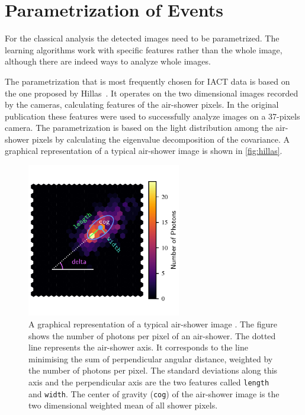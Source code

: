 \section{Parametrization of Events}
\label{sec:params}
%
For the classical analysis the detected images need to be parametrized. The
learning algorithms work with specific features rather than the whole image,
although there are indeed ways to analyze whole images.

The parametrization that is most frequently chosen for IACT data is based on
the one proposed by Hillas~\cite{Hillas}. It operates on the two dimensional
images recorded by the cameras, calculating features of the air-shower pixels.
In the original publication these features were used to successfully analyze
images on a 37-pixels camera. The parametrization is based on the light
distribution among the air-shower pixels by calculating the eigenvalue
decomposition of the covariance. A graphical representation of a typical
air-shower image is shown in \autoref{fig:hillas}.
%
\begin{figure}
  \centering%
  \includegraphics[width=0.6\textwidth]{Plots/hillas.pdf}%
  \caption{A graphical representation of a typical air-shower image \cite{maxhillas}. The figure shows the number of photons per pixel of an air-shower. The dotted
  line represents the air-shower axis. It corresponds to the line minimising the
  sum of perpendicular angular distance, weighted by the number of photons per
  pixel. The standard deviations along this axis and the perpendicular axis are
  the two features called \texttt{length} and \texttt{width}. The center of
  gravity (\texttt{cog}) of the air-shower image is the two dimensional weighted
  mean of all shower pixels.}%
  \label{fig:hillas}%
\end{figure}
